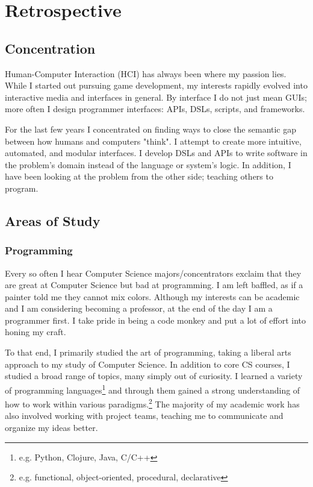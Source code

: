 \chapter{Retrospective}

\section*{Concentration}

Human-Computer Interaction (HCI) has always been where my passion lies.
While I started out pursuing game development, my interests rapidly
evolved into interactive media and interfaces in general. By interface I
do not just mean GUIs; more often I design programmer interfaces: APIs,
DSLs, scripts, and frameworks.

For the last few years I concentrated on finding ways to close the
semantic gap between how humans and computers "think". I attempt
to create more intuitive, automated, and modular interfaces. I develop
DSLs and APIs to write software in the problem's domain instead of the
language or system's logic. In addition, I have been looking at the
problem from the other side; teaching others to program.


\section*{Areas of Study}
\subsection*{Programming}

Every so often I hear Computer Science majors/concentrators exclaim that
they are great at Computer Science but bad at programming. I am left
baffled, as if a painter told me they cannot mix colors. Although my
interests can be academic and I am considering becoming a professor, at
the end of the day I am a programmer first. I take pride in being a code
monkey and put a lot of effort into honing my craft.

To that end, I primarily studied the art of programming, taking a
liberal arts approach to my study of Computer Science. In addition
to core CS courses, I studied a broad range of topics, many simply
out of curiosity. I learned a variety of programming languages\footnote{e.g.
Python, Clojure, Java, C/C++} and through them gained a strong
understanding of how to work within various paradigms.\footnote{e.g. functional,
object-oriented, procedural, declarative} The majority of my academic work has also
involved working with project teams, teaching me to communicate and
organize my ideas better.


